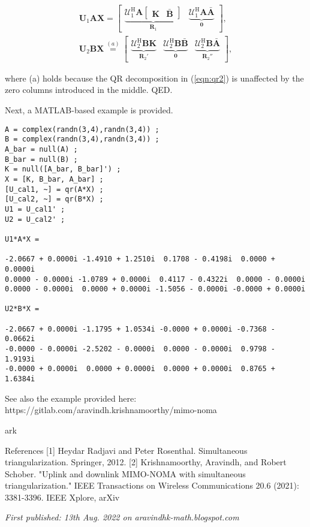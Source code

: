 \begin{align}\boldsymbol{U}_1\boldsymbol{A}\boldsymbol{X} = \begin{bmatrix}\underbrace{\boldsymbol{\mathcal{U}}_1^\mathrm{H} \boldsymbol{A} \begin{bmatrix}\boldsymbol{K} & \bar{\boldsymbol{B}}\end{bmatrix}}_{\boldsymbol{R}_1} &  \underbrace{\boldsymbol{\mathcal{U}}_1^\mathrm{H} \boldsymbol{A} \bar{\boldsymbol{A}}}_{\boldsymbol{0}}\end{bmatrix}, \\ \boldsymbol{U}_2\boldsymbol{B}\boldsymbol{X} \overset{(a)}{=} \begin{bmatrix} \underbrace{\boldsymbol{\mathcal{U}}_2^\mathrm{H} \boldsymbol{B} \boldsymbol{K}}_{\boldsymbol{R}_2'} & \underbrace{\boldsymbol{\mathcal{U}}_2^\mathrm{H} \boldsymbol{B} \bar{\boldsymbol{B}}}_{\boldsymbol{0}} &  \underbrace{\boldsymbol{\mathcal{U}}_2^\mathrm{H} \boldsymbol{B} \bar{\boldsymbol{A}}}_{\boldsymbol{R}_2''}\end{bmatrix},\end{align}

where (a) holds because the QR decomposition in (\ref{eqn:qr2}) is unaffected by the zero columns introduced in the middle. QED.

Next, a MATLAB-based example is provided.

\begin{verbatim}
A = complex(randn(3,4),randn(3,4)) ;
B = complex(randn(3,4),randn(3,4)) ;
A_bar = null(A) ;
B_bar = null(B) ;
K = null([A_bar, B_bar]') ;
X = [K, B_bar, A_bar] ;
[U_cal1, ~] = qr(A*X) ;
[U_cal2, ~] = qr(B*X) ;
U1 = U_cal1' ;
U2 = U_cal2' ;

U1*A*X =

-2.0667 + 0.0000i -1.4910 + 1.2510i  0.1708 - 0.4198i  0.0000 + 0.0000i
0.0000 - 0.0000i -1.0789 + 0.0000i  0.4117 - 0.4322i  0.0000 - 0.0000i
0.0000 - 0.0000i  0.0000 + 0.0000i -1.5056 - 0.0000i -0.0000 + 0.0000i

U2*B*X =

-2.0667 + 0.0000i -1.1795 + 1.0534i -0.0000 + 0.0000i -0.7368 - 0.0662i
-0.0000 - 0.0000i -2.5202 - 0.0000i  0.0000 - 0.0000i  0.9798 - 1.9193i
-0.0000 + 0.0000i  0.0000 + 0.0000i  0.0000 + 0.0000i  0.8765 + 1.6384i
\end{verbatim}

See also the example provided here: https://gitlab.com/aravindh.krishnamoorthy/mimo-noma

ark

References
[1] Heydar Radjavi and Peter Rosenthal. Simultaneous triangularization. Springer, 2012.
[2] Krishnamoorthy, Aravindh, and Robert Schober. "Uplink and downlink MIMO-NOMA with simultaneous triangularization." IEEE Transactions on Wireless Communications 20.6 (2021): 3381-3396. IEEE Xplore, arXiv

\emph{First published: 13th Aug. 2022 on aravindhk-math.blogspot.com}
